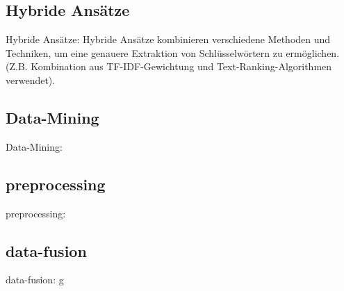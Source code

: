 \subsection{Hybride Ansätze}
Hybride Ansätze: Hybride Ansätze kombinieren verschiedene Methoden und Techniken, um eine genauere Extraktion von Schlüsselwörtern zu ermöglichen. (Z.B. Kombination aus TF-IDF-Gewichtung und Text-Ranking-Algorithmen verwendet).\cite{darmawan2015hybrid} \\

\subsection{Data-Mining}
Data-Mining: \cite{jun2001review}\cite{jain2013data}

\subsection{preprocessing}
preprocessing: \cite{garcia2016big}

\subsection{data-fusion}
data-fusion: \cite{famili1997data} \cite{frank2005comparing} \cite{bohne2013data}
\newpage
g
\newpage


